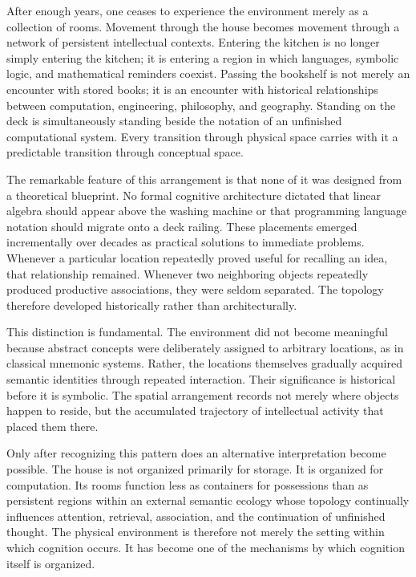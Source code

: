 \documentclass[12pt,oneside]{article}
\theoremstyle{remark}
\begin{document}
After enough years, one ceases to experience the environment merely as a collection of rooms. Movement through the house becomes movement through a network of persistent intellectual contexts. Entering the kitchen is no longer simply entering the kitchen; it is entering a region in which languages, symbolic logic, and mathematical reminders coexist. Passing the bookshelf is not merely an encounter with stored books; it is an encounter with historical relationships between computation, engineering, philosophy, and geography. Standing on the deck is simultaneously standing beside the notation of an unfinished computational system. Every transition through physical space carries with it a predictable transition through conceptual space.

The remarkable feature of this arrangement is that none of it was designed from a theoretical blueprint. No formal cognitive architecture dictated that linear algebra should appear above the washing machine or that programming language notation should migrate onto a deck railing. These placements emerged incrementally over decades as practical solutions to immediate problems. Whenever a particular location repeatedly proved useful for recalling an idea, that relationship remained. Whenever two neighboring objects repeatedly produced productive associations, they were seldom separated. The topology therefore developed historically rather than architecturally.

This distinction is fundamental. The environment did not become meaningful because abstract concepts were deliberately assigned to arbitrary locations, as in classical mnemonic systems. Rather, the locations themselves gradually acquired semantic identities through repeated interaction. Their significance is historical before it is symbolic. The spatial arrangement records not merely where objects happen to reside, but the accumulated trajectory of intellectual activity that placed them there.

Only after recognizing this pattern does an alternative interpretation become possible. The house is not organized primarily for storage. It is organized for computation. Its rooms function less as containers for possessions than as persistent regions within an external semantic ecology whose topology continually influences attention, retrieval, association, and the continuation of unfinished thought. The physical environment is therefore not merely the setting within which cognition occurs. It has become one of the mechanisms by which cognition itself is organized.
\end{document}
